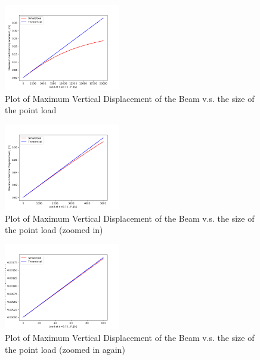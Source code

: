 \documentclass[letterpaper, 10 pt, conference]{ieeeconf}  %
\begin{document}
\begin{figure}[!ht]
        \centering
        \includegraphics[width=0.45\textwidth,keepaspectratio]{p3q2_implicit_maxvert.png}
        \caption{Plot of Maximum Vertical Displacement of the Beam v.s. the size of the point load}
        \label{"fig:p3q2_benefit"}
\end{figure}


\begin{figure}[!ht]
        \centering
        \includegraphics[width=0.45\textwidth,keepaspectratio]{p3q2_implicit_maxvert_zoomed.png}
        \caption{Plot of Maximum Vertical Displacement of the Beam v.s. the size of the point load (zoomed in)}
        \label{"fig:p3q2_benefit_zoomed"}
\end{figure}

\begin{figure}[!ht]
        \centering
        \includegraphics[width=0.45\textwidth,keepaspectratio]{p3_implicit_maxvert2xzoomed.png}
        \caption{Plot of Maximum Vertical Displacement of the Beam v.s. the size of the point load (zoomed in again)}
        \label{"fig:p3q2_benefit_zoomed2x"}
\end{figure}
\end{document}
